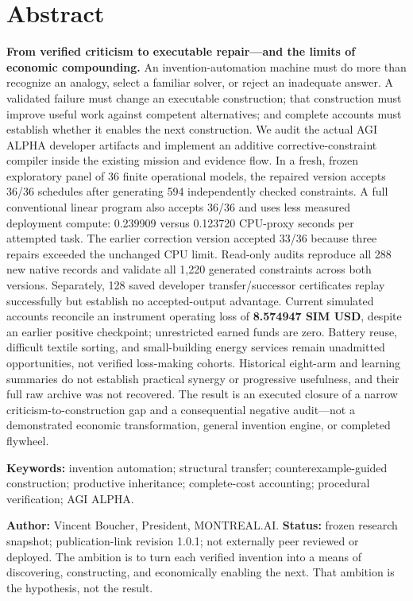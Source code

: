 \section*{Abstract}\label{abstract}

\textbf{From verified criticism to executable repair---and the limits of
economic compounding.} An invention-automation machine must do more than
recognize an analogy, select a familiar solver, or reject an inadequate
answer. A validated failure must change an executable construction; that
construction must improve useful work against competent alternatives;
and complete accounts must establish whether it enables the next
construction. We audit the actual AGI ALPHA developer artifacts and
implement an additive corrective-constraint compiler inside the existing
mission and evidence flow. In a fresh, frozen exploratory panel of 36
finite operational models, the repaired version accepts 36/36 schedules
after generating 594 independently checked constraints. A full
conventional linear program also accepts 36/36 and uses less measured
deployment compute: 0.239909 versus 0.123720 CPU-proxy seconds per
attempted task. The earlier correction version accepted 33/36 because
three repairs exceeded the unchanged CPU limit. Read-only audits
reproduce all 288 new native records and validate all 1,220 generated
constraints across both versions. Separately, 128 saved developer
transfer/successor certificates replay successfully but establish no
accepted-output advantage. Current simulated accounts reconcile an
instrument operating loss of \textbf{8.574947 SIM USD}, despite an
earlier positive checkpoint; unrestricted earned funds are zero. Battery
reuse, difficult textile sorting, and small-building energy services
remain unadmitted opportunities, not verified loss-making cohorts.
Historical eight-arm and learning summaries do not establish practical
synergy or progressive usefulness, and their full raw archive was not
recovered. The result is an executed closure of a narrow
criticism-to-construction gap and a consequential negative audit---not a
demonstrated economic transformation, general invention engine, or
completed flywheel.

\textbf{Keywords:} invention automation; structural transfer;
counterexample-guided construction; productive inheritance;
complete-cost accounting; procedural verification; AGI ALPHA.

\textbf{Author:} Vincent Boucher, President, MONTREAL.AI.
\textbf{Status:} frozen research snapshot; publication-link revision 1.0.1; not externally peer reviewed or deployed. The ambition is to turn each verified
invention into a means of discovering, constructing, and economically
enabling the next. That ambition is the hypothesis, not the result.

